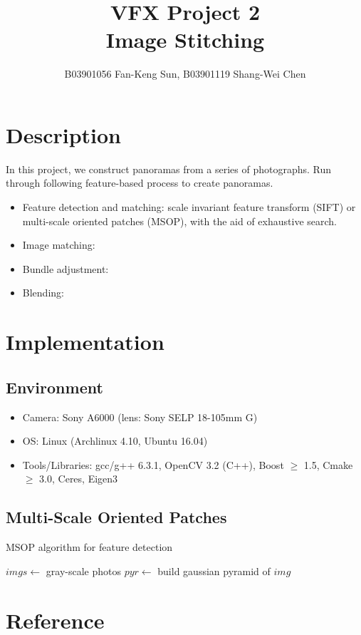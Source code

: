 \documentclass[11pt]{article}
\title{\bf{VFX Project 2\\\large{Image Stitching}}\vspace{-10pt}}
\author{B03901056 Fan-Keng Sun, B03901119 Shang-Wei Chen}
\date{}
\begin{document}
\maketitle
\section{Description}
In this project, we construct panoramas from a series of photographs. Run through following feature-based process to create panoramas.
\begin{itemize}
  \itemsep=0pt
  \item Feature detection and matching: scale invariant feature transform (SIFT) or multi-scale oriented patches (MSOP), with the aid of exhaustive search.
  \item Image matching: 
  \item Bundle adjustment: 
  \item Blending:
\end{itemize}
\section{Implementation}
\subsection{Environment}
\begin{itemize}
  \itemsep=0pt
  \item Camera: Sony A6000 (lens: Sony SELP 18-105mm G)
  \item OS: Linux (Archlinux 4.10, Ubuntu 16.04)
  \item Tools/Libraries: gcc/g++ 6.3.1, OpenCV 3.2 (C++), Boost $\geq$ 1.5, Cmake $\geq$ 3.0, Ceres, Eigen3
\end{itemize}

\subsection{Multi-Scale Oriented Patches}


\begin{algorithm}
\caption{MSOP algorithm for feature detection \cite{ref:msop}}
\begin{algorithmic}
\State $imgs\gets$ gray-scale photos
  \State $pyr\gets$ build gaussian pyramid of $img$ 
      
    \EndFor
  \EndFor
\EndFunction
\end{algorithmic}
\end{algorithm}

\section{Reference}

\end{document}
